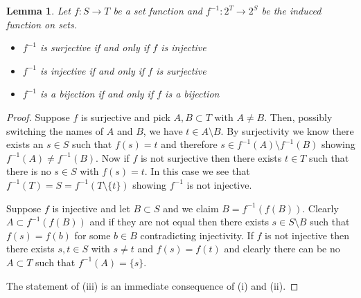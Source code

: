 \documentclass{amsart}
\newtheorem{lem}[thm]{Lemma}
\theoremstyle{remark}
\theoremstyle{definition}
\begin{document}
\begin{lem}Let $f : S \to T$ be a set function and $f^{-1} : 2^T \to
  2^S$ be the induced function on sets.
\begin{itemize}
\item[(i)]$f^{-1}$ is surjective if and only if $f$ is injective
\item[(ii)]$f^{-1}$ is injective if and only if $f$ is surjective
\item[(iii)]$f^{-1}$ is a bijection if and only if $f$ is a bijection
\end{itemize}
\end{lem}
\begin{proof}
Suppose $f$ is surjective and pick $A, B \subset T$ with $A \neq B$.
Then, possibly switching the names of $A$ and $B$, we have $t \in A
\setminus B$.  By surjectivity we know there exists an $s \in S$ such
that $f(s) = t$ and therefore $s \in f^{-1}(A) \setminus f^{-1}(B)$
showing $ f^{-1}(A) \neq f^{-1}(B)$.  Now if $f$ is not surjective
then there exists $t \in T$ such that there is no $s \in S$ with $f(s)
= t$.  In this case we see that $f^{-1}(T) = S = f^{-1}(T \setminus
\lbrace t \rbrace)$ showing $f^{-1}$ is not injective.

Suppose $f$ is injective and let $B \subset S$ and we claim $B =
f^{-1}(f(B))$.  Clearly $A \subset f^{-1}(f(B))$ and if they are not
equal then there exists $s \in S \setminus B$ such that $f(s) = f(b)$
for some $b \in B$ contradicting injectivity.  If $f$ is not injective
then there exists $s,t \in S$ with $s \neq t$ and $f(s) = f(t)$ and
clearly there can be no $A \subset T$ such that $f^{-1}(A) = \lbrace s \rbrace$.

The statement of (iii) is an immediate consequence of (i) and (ii).
\end{proof}
\end{document}
